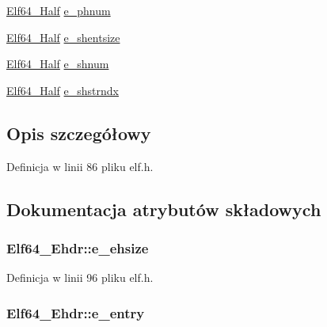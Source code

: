 \begin{DoxyCompactItemize}
\item 
\hyperlink{elf_8h_adb6a5584018b431da3472e7c6a7fd731}{Elf64\-\_\-\-Half} \hyperlink{struct_elf64___ehdr_af13bac5685d725c2ba9930c1176f3082}{e\-\_\-phnum}
\item 
\hyperlink{elf_8h_adb6a5584018b431da3472e7c6a7fd731}{Elf64\-\_\-\-Half} \hyperlink{struct_elf64___ehdr_a078af1eaf7681f9d85ff545b6c7aa9c5}{e\-\_\-shentsize}
\item 
\hyperlink{elf_8h_adb6a5584018b431da3472e7c6a7fd731}{Elf64\-\_\-\-Half} \hyperlink{struct_elf64___ehdr_a317679f1ef5e41e0717e95670c6a1d24}{e\-\_\-shnum}
\item 
\hyperlink{elf_8h_adb6a5584018b431da3472e7c6a7fd731}{Elf64\-\_\-\-Half} \hyperlink{struct_elf64___ehdr_ae8289d7705794be744876f6246242b9b}{e\-\_\-shstrndx}
\end{DoxyCompactItemize}


\subsection{Opis szczegółowy}


Definicja w linii 86 pliku elf.\-h.



\subsection{Dokumentacja atrybutów składowych}
\hypertarget{struct_elf64___ehdr_a404b7e3566d912b0382cacea17475e92}{
\subsubsection[{e\-\_\-ehsize}]{ Elf64\-\_\-\-Ehdr\-::e\-\_\-ehsize}}\label{struct_elf64___ehdr_a404b7e3566d912b0382cacea17475e92}


Definicja w linii 96 pliku elf.\-h.

\hypertarget{struct_elf64___ehdr_a943c7d038a3cc3c1115e84b4cd19966d}{
\subsubsection[{e\-\_\-entry}]{ Elf64\-\_\-\-Ehdr\-::e\-\_\-entry}}\label{struct_elf64___ehdr_a943c7d038a3cc3c1115e84b4cd19966d}


